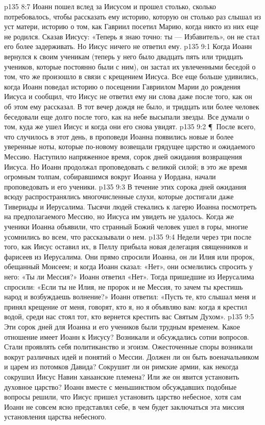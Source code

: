 \vs p135 8:7 Иоанн пошел вслед за Иисусом и прошел столько, сколько потребовалось, чтобы рассказать ему историю, которую он столько раз слышал из уст матери, историю о том, как Гавриил посетил Марию, когда никто из них еще не родился. Сказав Иисусу: «Теперь я знаю точно: ты --- Избавитель», он не стал его более задерживать. Но Иисус ничего не ответил ему.
\vs p135 9:1 Когда Иоанн вернулся к своим ученикам (теперь у него было двадцать пять или тридцать учеников, которые постоянно были с ним), он застал их увлеченными беседой о том, что же произошло в связи с крещением Иисуса. Все еще больше удивились, когда Иоанн поведал историю о посещении Гавриилом Марии до рождения Иисуса и сообщил, что Иисус не ответил ему ни слова даже после того, как он об этом ему рассказал. В тот вечер дождя не было, и тридцать или более человек беседовали еще долго после того, как на небе высыпали звезды. Все думали о том, куда же ушел Иисус и когда они его снова увидят.
\vs p135 9:2 \P\ После всего, что случилось в этот день, в проповеди Иоанна появились новые и более уверенные ноты, которые по\hyp{}новому возвещали грядущее царство и ожидаемого Мессию. Наступило напряженное время, сорок дней ожидания возвращения Иисуса. Но Иоанн продолжал проповедовать с великой силой; в это же время огромным толпам, собиравшимся вокруг Иоанна у Иордана, начали проповедовать и его ученики.
\vs p135 9:3 В течение этих сорока дней ожидания всюду распространялись многочисленные слухи, которые достигали даже Тивериады и Иерусалима. Тысячи людей стекались к лагерю Иоанна посмотреть на предполагаемого Мессию, но Иисуса им увидеть не удалось. Когда же ученики Иоанна объявили, что странный Божий человек ушел в горы, многие усомнились во всем, что рассказывали о нем.
\vs p135 9:4 Недели через три после того, как Иисус оставил их, в Пеллу прибыла новая делегация священников и фарисеев из Иерусалима. Они прямо спросили Иоанна, он ли Илия или пророк, обещанный Моисеем; и когда Иоанн сказал: «Нет», они осмелились спросить у него: «Ты ли Мессия?» Иоанн ответил «Нет». Тогда пришедшие из Иерусалима спросили: «Если ты не Илия, не пророк и не Мессия, то зачем ты крестишь народ и возбуждаешь волнение?» Иоанн ответил: «Пусть те, кто слышал меня и принял крещение от меня, говорят, кто я, но я объявляю вам: когда я крестил водой, среди нас стоял тот, кто вернется крестить вас Святым Духом».
\vs p135 9:5 Эти сорок дней для Иоанна и его учеников были трудным временем. Какое отношение имеет Иоанн к Иисусу? Возникали и обсуждались сотни вопросов. Стали проявлять себя политиканство и эгоизм. Ожесточенные споры возникали вокруг различных идей и понятий о Мессии. Должен ли он быть военачальником и царем из потомков Давида? Сокрушит ли он римские армии, как некогда сокрушил Иисус Навин ханаанские племена? Или же он явится установить духовное царство? Иоанн вместе с меньшинством обсуждавших подобные вопросы решили, что Иисус пришел установить царство небесное, хотя сам Иоанн не совсем ясно представлял себе, в чем будет заключаться эта миссия установления царства небесного.
